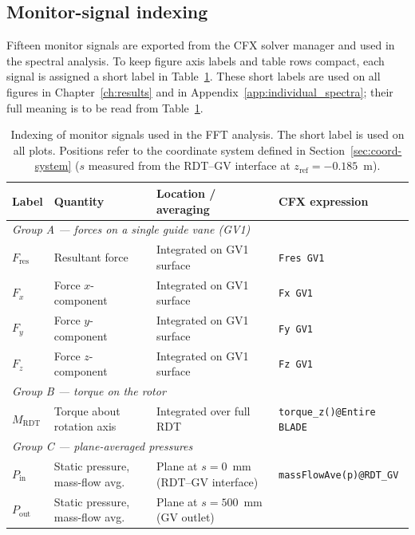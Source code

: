 \subsection{Monitor-signal indexing}
\label{sec:monitor-index}
 
Fifteen monitor signals are exported from the CFX solver manager and
used in the spectral analysis. To keep figure axis labels and table
rows compact, each signal is assigned a short label in
Table~\ref{tab:monitor-index}. These short labels are used on all
figures in Chapter~\ref{ch:results} and in Appendix~\ref{app:individual_spectra};
their full meaning is to be read from Table~\ref{tab:monitor-index}.
 
\begin{table}[H]
\centering
\small
\caption{Indexing of monitor signals used in the FFT analysis. The
short label is used on all plots. Positions refer to the coordinate
system defined in Section~\ref{sec:coord-system} ($s$ measured from
the RDT--GV interface at $z_{\mathrm{ref}} = -0.185$~m).}
\label{tab:monitor-index}
\begin{tabular}{llll}
\hline
Label & Quantity & Location / averaging & CFX expression \\ \hline
\multicolumn{4}{l}{\textit{Group A — forces on a single guide vane (GV1)}} \\
$F_{\mathrm{res}}$ & Resultant force     & Integrated on GV1 surface & \verb|Fres GV1| \\
$F_x$              & Force $x$-component & Integrated on GV1 surface & \verb|Fx GV1|   \\
$F_y$              & Force $y$-component & Integrated on GV1 surface & \verb|Fy GV1|   \\
$F_z$              & Force $z$-component & Integrated on GV1 surface & \verb|Fz GV1|   \\[0.4em]
\multicolumn{4}{l}{\textit{Group B — torque on the rotor}} \\
$M_{\mathrm{RDT}}$ & Torque about rotation axis & Integrated over full RDT
                                                & \verb|torque_z()@Entire BLADE| \\[0.4em]
\multicolumn{4}{l}{\textit{Group C — plane-averaged pressures}} \\
$P_{\mathrm{in}}$  & Static pressure, mass-flow avg.
                   & Plane at $s = 0$~mm (RDT--GV interface)
                   & \verb|massFlowAve(p)@RDT_GV| \\
$P_{\mathrm{out}}$ & Static pressure, mass-flow avg.
                   & Plane at $s = 500$~mm (GV outlet)

\end{tabular}
\end{table}
